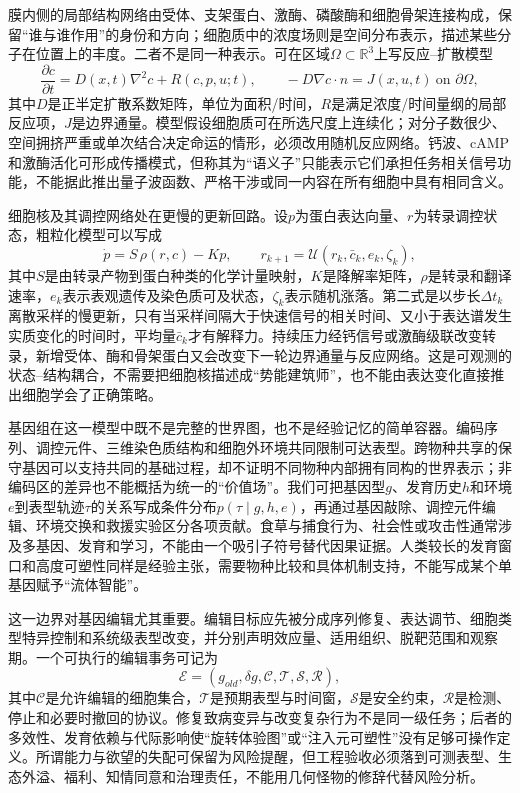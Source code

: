 膜内侧的局部结构网络由受体、支架蛋白、激酶、磷酸酶和细胞骨架连接构成，保留“谁与谁作用”的身份和方向；细胞质中的浓度场则是空间分布表示，描述某些分子在位置上的丰度。二者不是同一种表示。可在区域$\Omega\subset\mathbb R^3$上写反应--扩散模型
\begin{equation}
 \frac{\partial c}{\partial t}=D(x,t)\nabla^2c+R(c,p,u;t),\qquad
 -D\nabla c\cdot n=J(x,u,t)\ \text{on }\partial\Omega,
\end{equation}
其中$D$是正半定扩散系数矩阵，单位为面积/时间，$R$是满足浓度/时间量纲的局部反应项，$J$是边界通量。模型假设细胞质可在所选尺度上连续化；对分子数很少、空间拥挤严重或单次结合决定命运的情形，必须改用随机反应网络。钙波、cAMP和激酶活化可形成传播模式，但称其为“语义子”只能表示它们承担任务相关信号功能，不能据此推出量子波函数、严格干涉或同一内容在所有细胞中具有相同含义。

细胞核及其调控网络处在更慢的更新回路。设$p$为蛋白表达向量、$r$为转录调控状态，粗粒化模型可以写成
\begin{equation}
 \dot p=S\,\rho(r,c)-Kp,\qquad
 r_{k+1}=\mathcal U(r_k,\bar c_k,e_k,\zeta_k),
\end{equation}
其中$S$是由转录产物到蛋白种类的化学计量映射，$K$是降解率矩阵，$\rho$是转录和翻译速率，$e_k$表示表观遗传及染色质可及状态，$\zeta_k$表示随机涨落。第二式是以步长$\Delta t_k$离散采样的慢更新，只有当采样间隔大于快速信号的相关时间、又小于表达谱发生实质变化的时间时，平均量$\bar c_k$才有解释力。持续压力经钙信号或激酶级联改变转录，新增受体、酶和骨架蛋白又会改变下一轮边界通量与反应网络。这是可观测的状态--结构耦合，不需要把细胞核描述成“势能建筑师”，也不能由表达变化直接推出细胞学会了正确策略。

基因组在这一模型中既不是完整的世界图，也不是经验记忆的简单容器。编码序列、调控元件、三维染色质结构和细胞外环境共同限制可达表型。跨物种共享的保守基因可以支持共同的基础过程，却不证明不同物种内部拥有同构的世界表示；非编码区的差异也不能概括为统一的“价值场”。我们可把基因型$g$、发育历史$h$和环境$e$到表型轨迹$\tau$的关系写成条件分布$p(\tau\mid g,h,e)$，再通过基因敲除、调控元件编辑、环境交换和救援实验区分各项贡献。食草与捕食行为、社会性或攻击性通常涉及多基因、发育和学习，不能由一个吸引子符号替代因果证据。人类较长的发育窗口和高度可塑性同样是经验主张，需要物种比较和具体机制支持，不能写成某个单基因赋予“流体智能”。

这一边界对基因编辑尤其重要。编辑目标应先被分成序列修复、表达调节、细胞类型特异控制和系统级表型改变，并分别声明效应量、适用组织、脱靶范围和观察期。一个可执行的编辑事务可记为
\begin{equation}
 \mathcal E=(g_{old},\delta g,\mathcal C,\mathcal T,\mathcal S,\mathcal R),
\end{equation}
其中$\mathcal C$是允许编辑的细胞集合，$\mathcal T$是预期表型与时间窗，$\mathcal S$是安全约束，$\mathcal R$是检测、停止和必要时撤回的协议。修复致病变异与改变复杂行为不是同一级任务；后者的多效性、发育依赖与代际影响使“旋转体验图”或“注入元可塑性”没有足够可操作定义。所谓能力与欲望的失配可保留为风险提醒，但工程验收必须落到可测表型、生态外溢、福利、知情同意和治理责任，不能用几何怪物的修辞代替风险分析。


